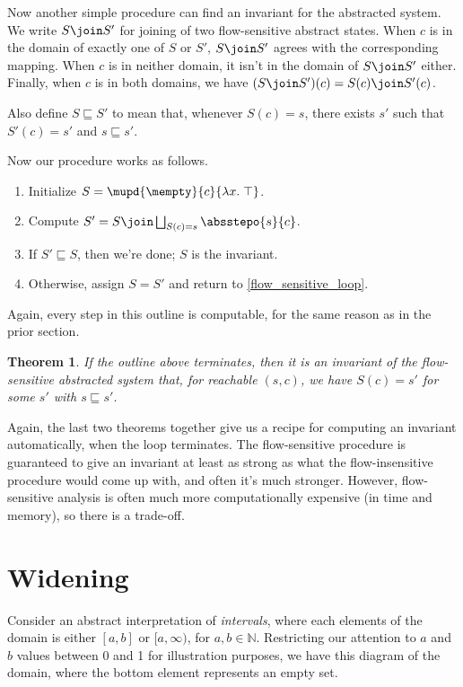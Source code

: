 \documentclass{amsbook}
\newtheorem{theorem}{Theorem}[chapter]
\theoremstyle{definition}
\theoremstyle{remark}
\numberwithin{section}{chapter}
\numberwithin{equation}{chapter}
\begin{document}
Now another simple procedure can find an invariant for the abstracted system.
We write $S \join S'$ for joining of two flow-sensitive abstract states.
When $c$ is in the domain of exactly one of $S$ or $S'$, $S \join S'$ agrees with the corresponding mapping.
When $c$ is in neither domain, it isn't in the domain of $S \join S'$ either.
Finally, when $c$ is in both domains, we have $(S \join S')(c) = S(c) \join S'(c)$.

Also define $S \sqsubseteq S'$ to mean that, whenever $S(c) = s$, there exists $s'$ such that $S'(c) = s'$ and $s \sqsubseteq s'$.

Now our procedure works as follows.

\begin{enumerate}
\item Initialize $S = \mupd{\mempty}{c}{\lambda x. \; \top}$.
\item \label{flow_sensitive_loop}Compute $S' = S \join \bigsqcup_{S(c) = s} \absstepo{s}{c}$.
\item If $S' \sqsubseteq S$, then we're done; $S$ is the invariant.
\item Otherwise, assign $S = S'$ and return to \ref{flow_sensitive_loop}.
\end{enumerate}

Again, every step in this outline is computable, for the same reason as in the prior section.

\begin{theorem}\label{flow_sensitive_iteration}
  \invariants
  If the outline above terminates, then it is an invariant of the flow-sensitive abstracted system that, for reachable $(s, c)$, we have $S(c) = s'$ for some $s'$ with $s \sqsubseteq s'$.
\end{theorem}

Again, the last two theorems together give us a recipe for computing an invariant automatically, when the loop terminates.
The flow-sensitive procedure is guaranteed to give an invariant at least as strong as what the flow-insensitive procedure would come up with, and often it's much stronger.
However, flow-sensitive analysis is often much more computationally expensive (in time and memory), so there is a trade-off.


\section{Widening}

Consider an abstract interpretation of \emph{intervals}, where each elements of the domain is either $[a, b]$ or $[a, \infty)$, for $a, b \in \mathbb N$.
Restricting our attention to $a$ and $b$ values between 0 and 1 for illustration purposes, we have this diagram of the domain, where the bottom element represents an empty set.
\end{document}
